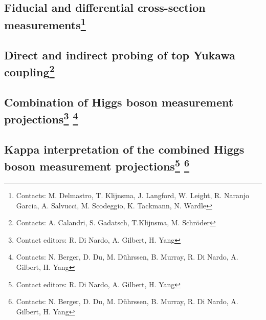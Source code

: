 \documentclass[../report.tex]{subfiles}
\providecommand{\main}{..}
\begin{document}
\subsection[Fiducial and differential cross-section measurements]{Fiducial and differential cross-section measurements\footnote{Contacts: M. Delmastro, T. Klijnsma, J. Langford, W. Leight, R. Naranjo Garcia, A. Salvucci, M. Scodeggio, K. Tackmann, N. Wardle }}
\label{sec2:fiducial}



\subsection[Direct and indirect probing of top Yukawa coupling]{Direct and indirect probing of top Yukawa coupling\footnote{Contacts: A. Calandri, S. Gadatsch, T.Klijnsma, M. Schr\"oder}}
\label{sec2:top}


\subsection[Combination of Higgs boson measurement projections]{Combination of Higgs boson measurement projections\footnote{Contact editors: R. Di Nardo, A. Gilbert, H. Yang}
\footnote{Contacts: N. Berger, D. Du, M. D\"uhrssen, B. Murray, R. Di Nardo, A. Gilbert, H. Yang}}
\label{sec2:exp_combination}


\subsection[Kappa interpretation of the combined Higgs boson measurement projections]{Kappa interpretation of the combined Higgs boson measurement projections\footnote{Contact editors: R. Di Nardo, A. Gilbert, H. Yang}
\footnote{Contacts: N. Berger, D. Du, M. D\"uhrssen, B. Murray, R. Di Nardo, A. Gilbert, H. Yang}}
\label{sec2:exp_kappa}

\end{document}
